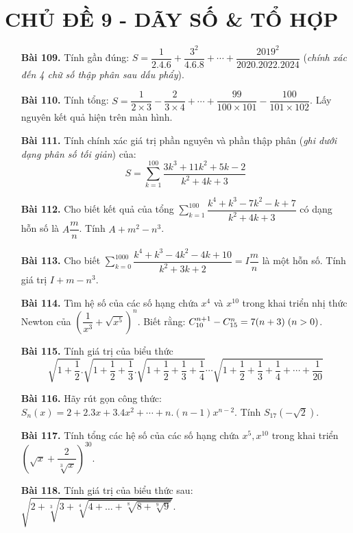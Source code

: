 \documentclass[12pt,a4paper]{article}
\begin{document}
\section*{CHỦ ĐỀ 9 - DÃY SỐ \& TỔ HỢP}
\begin{enumerate}
    \item[\textbf{Bài 109.}] Tính gần đúng: $S = \dfrac{1}{2.4.6} + \dfrac{3^2}{4.6.8} + \cdots + \dfrac{2019^2}{2020.2022.2024}$ (\textit{chính xác đến 4 chữ số thập phân sau dấu phẩy}).
    \item[\textbf{Bài 110.}] Tính tổng: $S = \dfrac{1}{2\times3} - \dfrac{2}{3\times4} + \cdots + \dfrac{99}{100\times101} - \dfrac{100}{101\times102}$. Lấy nguyên kết quả hiện trên màn hình.
    \item[\textbf{Bài 111.}] Tính chính xác giá trị phần nguyên và phần thập phân (\textit{ghi dưới dạng phân số tối giản}) của: \[S = \displaystyle \sum_{k=1}^{100} \dfrac{3k^3  + 11k^2 + 5k - 2}{k^2+4k+3}\]
    \item[\textbf{Bài 112.}] Cho biết kết quả của tổng $\displaystyle \sum_{k=1}^{100} \dfrac{k^4 + k^3 - 7k^2 - k + 7}{k^2 + 4k + 3}$ có dạng hỗn số là $A\dfrac{m}{n}$. Tính $A + m^2 - n^3$.
    \item[\textbf{Bài 113.}] Cho biết $\displaystyle \sum_{k=0}^{1000} \dfrac{k^4 + k^3 - 4k^2 - 4k + 10}{k^2 + 3k + 2} = I\dfrac{m}{n}$ là một hỗn số. Tính giá trị $I + m - n^3$.
    \item[\textbf{Bài 114.}] Tìm hệ số của các số hạng chứa $x^4$ và $x^{10}$ trong khai triển nhị thức Newton của $\left( \dfrac{1}{x^3} + \sqrt{x^5}\right)^n$. Biết rằng: $C_{10}^{n+1} - C_{15}^{n} = 7(n+3) \thickspace (n>0)$.
    \item[\textbf{Bài 115.}] Tính giá trị của biểu thức\[\sqrt{1+\dfrac{1}{2}}.\sqrt{1+\dfrac{1}{2}+\dfrac{1}{3}}.\sqrt{1+\dfrac{1}{2}+\dfrac{1}{3}+\dfrac{1}{4}}\cdots\sqrt{1+\dfrac{1}{2}+\dfrac{1}{3}+\dfrac{1}{4} + \cdots + \dfrac{1}{20}}\]
    \item[\textbf{Bài 116.}] Hãy rút gọn công thức: $S_n(x) = 2 + 2.3x + 3.4x^2 + \cdots + n.(n-1)x^{n-2}.$ Tính $S_{17}(-\sqrt{2})$.
    \item[\textbf{Bài 117.}] Tính tổng các hệ số của các số hạng chứa $x^5,x^{10}$ trong khai triển $\left(\sqrt{x} + \dfrac{2}{\sqrt[3]{x}}\right)^{30}.$
    \item[\textbf{Bài 118.}] Tính giá trị của biểu thức sau: $\sqrt{2+\sqrt[3]{3 + \sqrt[4]{4 + \ldots + \sqrt[8]{8 + \sqrt[9]{9}}}}}.$
\end{enumerate}
\end{document}
